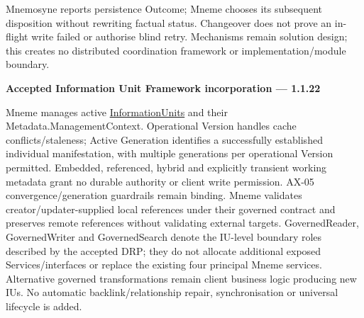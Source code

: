 Mnemosyne reports persistence Outcome; Mneme chooses its subsequent disposition without rewriting factual status. Changeover does not prove an in-flight write failed or authorise blind retry. Mechanisms remain solution design; this creates no distributed coordination framework or implementation/module boundary.



\par\medskip\textbf{Accepted Information Unit Framework incorporation — 1.1.22}\par


Mneme manages active \hyperref[element:74ec609de1ae498fbf9d13e4ef8c6cbe]{InformationUnits} and their Metadata.ManagementContext. Operational Version handles cache conflicts/staleness; Active Generation identifies a successfully established individual manifestation, with multiple generations per operational Version permitted. Embedded, referenced, hybrid and explicitly transient working metadata grant no durable authority or client write permission. AX-05 convergence/generation guardrails remain binding. Mneme validates creator/updater-supplied local references under their governed contract and preserves remote references without validating external targets. GovernedReader, GovernedWriter and GovernedSearch denote the IU-level boundary roles described by the accepted DRP; they do not allocate additional exposed Services/interfaces or replace the existing four principal Mneme services. Alternative governed transformations remain client business logic producing new IUs. No automatic backlink/relationship repair, synchronisation or universal lifecycle is added.



